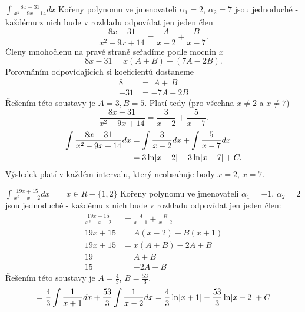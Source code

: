       \begin{example}$\displaystyle\int{\frac{8x-31}{x^2-9x+14}}dx$\cite[s.~90]{Knichal}\newline
        Kořeny polynomu ve jmenovateli $\alpha_1 = 2$, $\alpha_2 = 7$ jsou jednoduché - každému z
        nich bude v rozkladu odpovídat jen jeden člen $$\frac{8x-31}{x^2-9x+14} = \frac{A}{x-2}
        + \frac{B}{x-7}.$$ Členy mnohočlenu na pravé straně seřadíme podle mocnin $x$ $$8x-31 =
         x(A+B)+(7A-2B).$$ Porovnáním odpovídajících si koeficientů dostaneme
        \begin{align*}
          8   &=   \; A + \, B \\
          -31 &= -7A - 2B
        \end{align*}
        Řešením této soustavy je $A = 3, B = 5$. Platí tedy (pro všechna $x \neq 2$ a $x \neq 7$)
        $$\frac{8x-31}{x^2-9x+14} = \frac{3}{x-2} + \frac{5}{x-7}.$$
        \begin{align*}
          \int{\frac{8x-31}{x^2-9x+14}}dx 
            &= \int{\frac{3}{x-2}}dx + \int{\frac{5}{x-7}}dx      \\
            &= 3\ln\abs{x-2} + 3\ln\abs{x-7} + C.
        \end{align*}
        Výsledek platí v každém intervalu, který neobsahuje body \(x = 2\), \(x = 7\).
      \end{example}
      
      \begin{example}\label{MA:eq_ex1}$\displaystyle\int{\frac{19x+15}{x^2-x-2}}dx \qquad 
      x\in
        R-\{1,2\} $ \newline Kořeny polynomu ve jmenovateli $\alpha_1 = -1$, $\alpha_2 = 2$ jsou
        jednoduché - každému z nich bude v rozkladu odpovídat jen jeden člen: 
        \begin{align*}
          \frac{19x+15}{x^2-x-2}     &= \frac{A}{x+1} + \frac{B}{x-2} \\
                           19x +15   &= A(x-2) + B(x+1)               \\
                           19x +15   &= x(A+B) - 2A + B               \\
                           19        &= A + B                         \\
                                15   &=        - 2A + B
        \end{align*}              
        Řešením této soustavy je $A = \frac{4}{3}$, $B = \frac{53}{3}$.
        \begin{equation*}
          = \frac{4}{3}\int{\frac{1}{x+1}}dx+\frac{53}{3}\int{\frac{1}{x-2}}dx 
          = \frac{4}{3}\ln\abs{x+1} - \frac{53}{3}\ln\abs{x-2} +  C
        \end{equation*}      
      \end{example}
  

